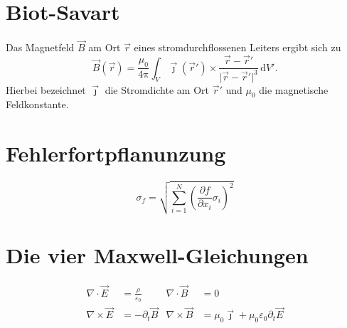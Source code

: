 \documentclass{scrartcl}
\begin{document}
\section{Biot-Savart}
Das Magnetfeld $\vec{B}$ am Ort $\vec{r}$ eines stromdurchflossenen Leiters ergibt sich zu
\begin{equation}
  \vec{B}(\vec{r}) = \frac{\mu_0}{4\mathup{\pi}}
  \int_V \vec{\jmath}(\vec{r}') \times \frac{\vec{r} - \vec{r}'}{\lvert \vec{r} - \vec{r}' \rvert^3} \, \mathup{d}V' .
\end{equation}
Hierbei bezeichnet $\vec{\jmath}$ die Stromdichte am Ort $\vec{r}'$ und $\mu_0$ die magnetische Feldkonstante.

\section{Fehlerfortpflanunzung}
\begin{equation}
  \sigma_f = \sqrt{\sum\limits_{i=1}^N \left( \frac{\partial f}{\partial x_i}
                   \sigma_i \right)^{\!\!2}}
\end{equation}

\section{Die vier Maxwell-Gleichungen}
\begin{align}
  \nabla \cdot  \vec{E} &= \frac{\rho}{\varepsilon_0} &
  \nabla \cdot  \vec{B} &= 0 \\
  \nabla \times \vec{E} &= - \partial_t \vec{B} &
  \nabla \times \vec{B} &= \mu_0 \vec{\jmath} + \mu_0 \varepsilon_0 \partial_t \vec{E}
\end{align}
\end{document}
